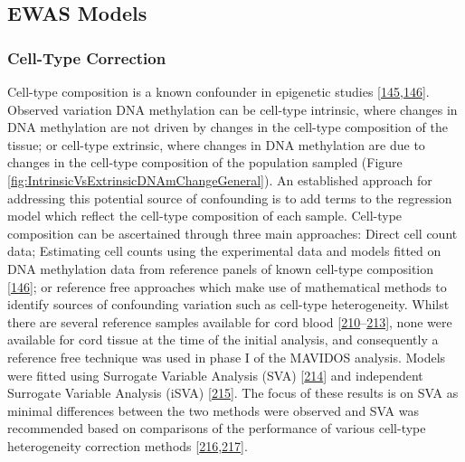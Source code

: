 \documentclass[
]{book}
\begin{document}
\hypertarget{ewas-models}{%
\subsection{EWAS Models}\label{ewas-models}}

\hypertarget{cell-type-correction}{%
\subsubsection{Cell-Type Correction}\label{cell-type-correction}}

Cell-type composition is a known confounder in epigenetic studies {[}\protect\hyperlink{ref-Jaffe2014}{145},\protect\hyperlink{ref-Houseman2012}{146}{]}.
Observed variation DNA methylation can be cell-type intrinsic, where changes in DNA methylation are not driven by changes in the cell-type composition of the tissue; or cell-type extrinsic, where changes in DNA methylation are due to changes in the cell-type composition of the population sampled (Figure \ref{fig:IntrinsicVsExtrinsicDNAmChangeGeneral}).
An established approach for addressing this potential source of confounding is to add terms to the regression model which reflect the cell-type composition of each sample.
Cell-type composition can be ascertained through three main approaches: Direct cell count data; Estimating cell counts using the experimental data and models fitted on DNA methylation data from reference panels of known cell-type composition {[}\protect\hyperlink{ref-Houseman2012}{146}{]}; or reference free approaches which make use of mathematical methods to identify sources of confounding variation such as cell-type heterogeneity.
Whilst there are several reference samples available for cord blood {[}\protect\hyperlink{ref-Cardenas2016}{210}--\protect\hyperlink{ref-Gervin2016}{213}{]}, none were available for cord tissue at the time of the initial analysis, and consequently a reference free technique was used in phase I of the MAVIDOS analysis.
Models were fitted using Surrogate Variable Analysis (SVA) {[}\protect\hyperlink{ref-Leek2007}{214}{]} and independent Surrogate Variable Analysis (iSVA) {[}\protect\hyperlink{ref-Teschendorff2011}{215}{]}.
The focus of these results is on SVA as minimal differences between the two methods were observed and SVA was recommended based on comparisons of the performance of various cell-type heterogeneity correction methods {[}\protect\hyperlink{ref-McGregor2016}{216},\protect\hyperlink{ref-Teschendorff2017}{217}{]}.
\end{document}
